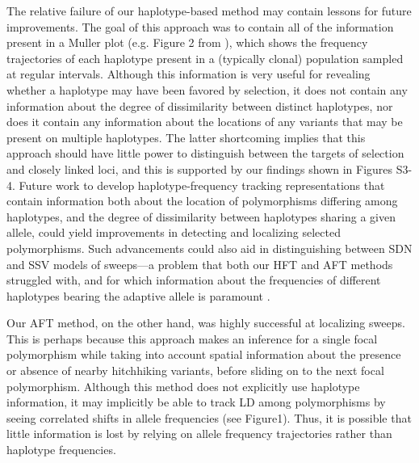 The relative failure of our haplotype-based method may contain lessons for future improvements. The goal of this approach was to contain all of the information present in a Muller plot (e.g. Figure 2 from \cite{herronParallelEvolutionaryDynamics2013}), which shows the frequency trajectories of each haplotype present in a (typically clonal) population sampled at regular intervals. Although this information is very useful for revealing whether a haplotype may have been favored by selection, it does not contain any information about the degree of dissimilarity between distinct haplotypes, nor does it contain any information about the locations of any variants that may be present on multiple haplotypes. The latter shortcoming implies that this approach should have little power to distinguish between the targets of selection and closely linked loci, and this is supported by our findings shown in Figures S3-4. Future work to develop haplotype-frequency tracking representations that contain information both about the location of polymorphisms differing among haplotypes, and the degree of dissimilarity between haplotypes sharing a given allele, could yield improvements in detecting and localizing selected polymorphisms. Such advancements could also aid in distinguishing between SDN and SSV models of sweeps—a problem that both our HFT and AFT methods struggled with, and for which information about the frequencies of different haplotypes bearing the adaptive allele is paramount \cite{garudRecentSelectiveSweeps2015}.

Our AFT method, on the other hand, was highly successful at localizing sweeps. This is perhaps because this approach makes an inference for a single focal polymorphism while taking into account spatial information about the presence or absence of nearby hitchhiking variants, before sliding on to the next focal polymorphism. Although this method does not explicitly use haplotype information, it may implicitly be able to track LD among polymorphisms by seeing correlated shifts in allele frequencies (see Figure1). Thus, it is possible that little information is lost by relying on allele frequency trajectories rather than haplotype frequencies.

